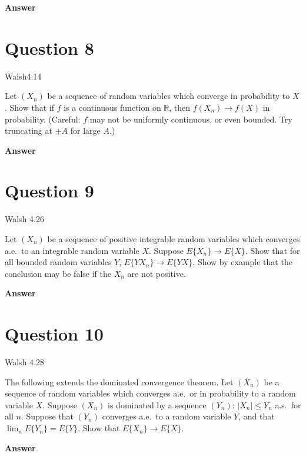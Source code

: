 \documentclass[letterpaper]{article}
\begin{document}
		\textbf{Answer}
		
		\clearpage
		
		\section{Question 8}
		
		{\color{deepred} Walsh4.14} 
		
		Let $(X_n)$ be a sequence of random variables which converge in probability to $X$. Show that if $f$ is a continuous function on $\mathbb{R}$, then $f(X_n) \to f(X)$ in probability. (Careful: $f$ may not be uniformly continuous, or even bounded. Try truncating at $\pm A$ for large $A$.)
		
		\textbf{Answer}
		
		\clearpage
		
		\section{Question 9}
		
		{\color{deepred} Walsh 4.26} 
		
		Let $(X_n)$ be a sequence of positive integrable random variables which converges a.e.\ to an integrable random variable $X$. Suppose $E\{X_n\} \to E\{X\}$. Show that for all bounded random variables $Y$, $E\{Y X_n\} \to E\{Y X\}$. Show by example that the conclusion may be false if the $X_n$ are not positive.
		
		
		
		
		
		\textbf{Answer}
		
		\clearpage
		
		\section{Question 10}
		
		{\color{deepred} Walsh 4.28} 
		
		The following extends the dominated convergence theorem. Let $(X_n)$ be a sequence of random variables which converges a.e.\ or in probability to a random variable $X$. Suppose $(X_n)$ is dominated by a sequence $(Y_n)$: $|X_n| \le Y_n$ a.s.\ for all $n$. Suppose that $(Y_n)$ converges a.e.\ to a random variable $Y$, and that $\lim_{n} E\{Y_n\} = E\{Y\}$. Show that $E\{X_n\} \to E\{X\}$.
		
		\textbf{Answer}
		
		\clearpage
		
\end{document}
